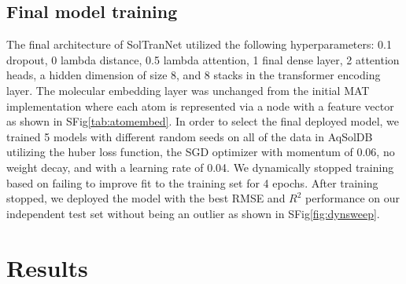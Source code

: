 \documentclass[journal=jmcmar,manuscript=article]{achemso}
\begin{document}
\subsection{Final model training}
The final architecture of SolTranNet utilized the following hyperparameters: 0.1 dropout, 0 lambda distance, 0.5 lambda attention, 1 final dense layer, 2 attention heads, a hidden dimension of size 8, and 8 stacks in the transformer encoding layer.
The molecular embedding layer was unchanged from the initial MAT implementation\cite{MAT} where each atom is represented via a node with a feature vector as shown in SFig\ref{tab:atomembed}.
In order to select the final deployed model, we trained 5 models with different random seeds on all of the data in AqSolDB utilizing the huber loss function, the SGD optimizer with momentum of 0.06, no weight decay, and with a learning rate of 0.04.
We dynamically stopped training based on failing to improve fit to the training set for 4 epochs.
After training stopped, we deployed the model with the best RMSE and $R^2$ performance on our independent test set without being an outlier as shown in SFig\ref{fig:dynsweep}.

\section{Results}
\end{document}
